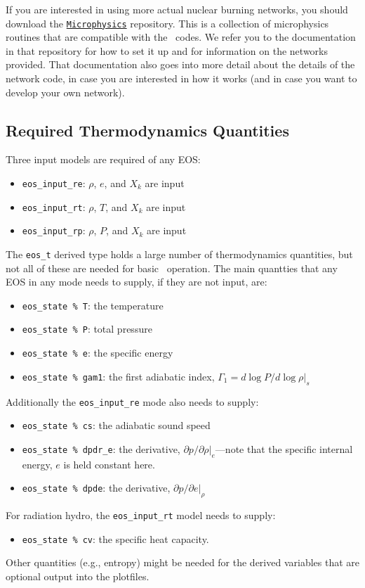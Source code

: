 If you are interested in using more actual nuclear burning networks,
you should download the \href{https://github.com/BoxLib-Codes/Microphysics}{\tt Microphysics} 
repository. This is a collection of microphysics routines that are compatible with the 
\boxlib\ codes. We refer you to the documentation in that repository for how to set it up 
and for information on the networks provided. That documentation 
also goes into more detail about the details of the network code, in case you are interested in 
how it works (and in case you want to develop your own network).

\subsection{Required Thermodynamics Quantities}

Three input models are required of any EOS:
\begin{itemize}
\item {\tt eos\_input\_re}: $\rho$, $e$, and $X_k$ are input
\item {\tt eos\_input\_rt}: $\rho$, $T$, and $X_k$ are input
\item {\tt eos\_input\_rp}: $\rho$, $P$, and $X_k$ are input
\end{itemize}

The {\tt eos\_t} derived type holds a large number of thermodynamics
quantities, but not all of these are needed for basic
\castro\ operation.  The main quantties that any EOS in any mode needs to
supply, if they are not input, are:
\begin{itemize}
  \item {\tt eos\_state \% T}: the temperature
  \item {\tt eos\_state \% P}: total pressure
  \item {\tt eos\_state \% e}: the specific energy
  \item {\tt eos\_state \% gam1}: the first adiabatic index, 
       $\Gamma_1 = d\log P / d\log \rho |_s$
\end{itemize}
Additionally the {\tt eos\_input\_re} mode also needs to supply:
\begin{itemize}
  \item {\tt eos\_state \% cs}: the adiabatic sound speed
  \item {\tt eos\_state \% dpdr\_e}: the derivative, $\partial
    p/\partial \rho |_e$---note that the specific internal energy, $e$
    is held constant here.
  \item {\tt eos\_state \% dpde}: the derivative, $\partial p /
    \partial e |_\rho$
\end{itemize}
For radiation hydro, the {\tt eos\_input\_rt} model needs to supply:
\begin{itemize}
  \item {\tt eos\_state \% cv}: the specific heat capacity.
\end{itemize}
Other quantities (e.g., entropy) might be needed for the derived
variables that are optional output into the plotfiles.
